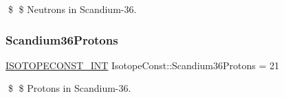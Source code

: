 \$ \$ Neutrons in Scandium-\/36. \mbox{\label{group___isotope_const-_scandium-_sc36_gad4993661b9f83c37a8a97058c79e0c0a}} 
\subsubsection{\texorpdfstring{Scandium36\+Protons}{Scandium36Protons}}
{\footnotesize\ttfamily \mbox{\hyperlink{group___isotope_const-_macros_ga5f18360b3e99483a35c32d789e62621c}{I\+S\+O\+T\+O\+P\+E\+C\+O\+N\+S\+T\+\_\+\+I\+NT}} Isotope\+Const\+::\+Scandium36\+Protons = 21}

\$ \$ Protons in Scandium-\/36. 